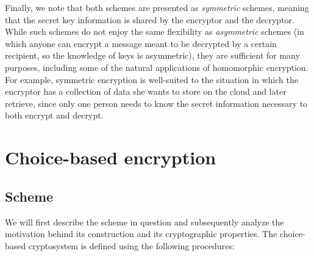 \documentclass[11pt]{report}
\begin{document}
Finally, we note that both schemes are presented as \emph{symmetric} schemes, meaning that the secret key information is shared by the encryptor and the decryptor. While such schemes do not enjoy the same flexibility as \emph{asymmetric} schemes (in which anyone can encrypt a message meant to be decrypted by a certain recipient, so the knowledge of keys is asymmetric), they are sufficient for many purposes, including some of the natural applications of homomorphic encryption. For example, symmetric encryption is well-suited to the situation in which the encryptor has a collection of data she wants to store on the cloud and later retrieve, since only one person needs to know the secret information necessary to both encrypt and decrypt.

\section{Choice-based encryption}

\subsection{Scheme}

We will first describe the scheme in question and subsequently analyze the motivation behind its construction and its cryptographic properties. The choice-based cryptosystem is defined using the following procedures:
\end{document}
